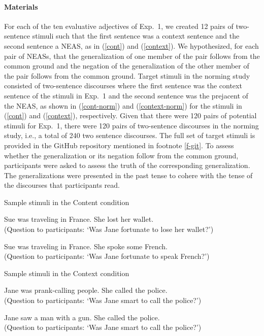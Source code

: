 \documentclass[11pt,fleqn]{article}
\newcommand{\6}{\mbox{$[\hspace*{-.6mm}[$}}
\newcommand{\9}{\mbox{$]\hspace*{-.6mm}]$}}
\begin{document}
\paragraph{Materials} For each of the ten evaluative adjectives of Exp.~1, we created 12 pairs of two-sentence stimuli such that the first sentence was a context sentence and the second sentence a NEAS, as in (\ref{cont}) and (\ref{context}). We hypothesized, for each pair of NEASs, that the generalization of one member of the pair follows from the common ground and the negation of the generalization of the other member of the pair follows from the common ground. Target stimuli in the norming study consisted of two-sentence discourses where the first sentence was the context sentence of the stimuli in Exp.~1 and the second sentence was the prejacent of the NEAS, as shown in (\ref{cont-norm}) and (\ref{context-norm}) for the stimuli in (\ref{cont}) and (\ref{context}), respectively. Given that there were 120 pairs of potential stimuli for Exp.~1, there were 120 pairs of two-sentence discourses in the norming study, i.e., a total of 240 two sentence discourses. The full set of target stimuli is provided in the GitHub repository mentioned in footnote \ref{f-git}. To assess whether the generalization or its negation follow from the common ground, participants were asked to assess the truth of the corresponding generalization. The generalizations were presented in the past tense to cohere with the tense of the discourses that participants read.


\begin{exe}
\ex\label{cont-norm} Sample stimuli in the Content condition 

\begin{xlist}
\ex Sue was traveling in France. She lost her wallet. \\ (Question to  participants: `Was Jane fortunate to lose her wallet?')

\ex Sue was traveling in France. She spoke some French. \\ (Question to participants: `Was Jane fortunate to speak French?')

\end{xlist}

\ex\label{context-norm} Sample stimuli in the Context condition

\begin{xlist}
\ex Jane was prank-calling people. She called the police. \\ (Question to participants: `Was Jane smart to call the police?')

\ex Jane saw a man with a gun. She called the police. \\ (Question to participants: `Was Jane smart to call the police?')
\end{xlist}
\end{exe}
\end{document}
